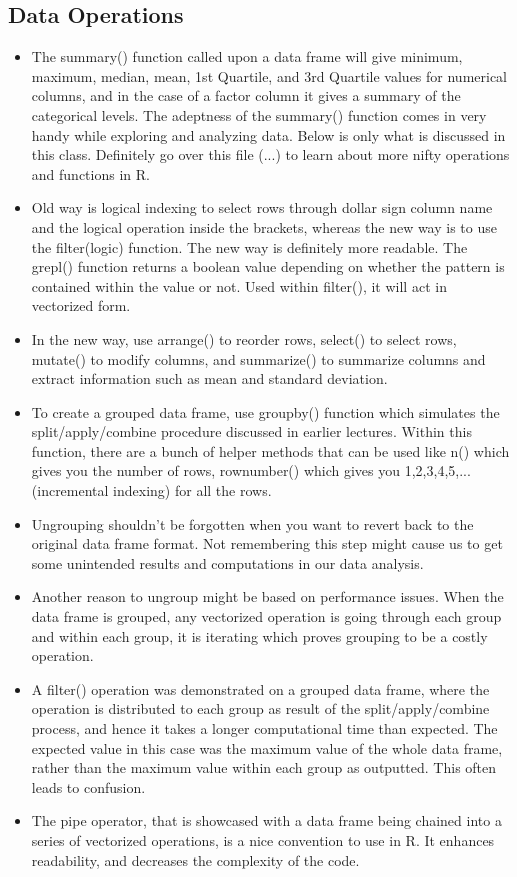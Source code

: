 \subsection{Data Operations}
\begin{itemize}
    \item The summary() function called upon a data frame will give minimum, maximum,
    median, mean, 1st Quartile, and 3rd Quartile values for numerical columns, and in the
    case of a factor column it gives a summary of the categorical levels. The adeptness of
    the summary() function comes in very handy while exploring and analyzing data.
    Below is only what is discussed in this class. Definitely go over this file (...) to
    learn about more nifty operations and functions in R.
    \item Old way is logical indexing to select rows through dollar sign column name and
    the logical operation inside the brackets, whereas the new way is to use the
    filter(logic) function. The new way is definitely more readable. The grepl() function
    returns a boolean value depending on whether the pattern is contained within the value
    or not. Used within filter(), it will act in vectorized form.
    \item In the new way, use arrange() to reorder rows, select() to select rows, mutate()
    to modify columns, and summarize() to summarize columns and extract information such
    as mean and standard deviation.
    \item To create a grouped data frame, use groupby() function which simulates the
    split/apply/combine procedure discussed in earlier lectures. Within this function,
    there are a bunch of helper methods that can be used like n() which gives you the
    number of rows, rownumber() which gives you 1,2,3,4,5,... (incremental indexing) for
    all the rows. 
    \item Ungrouping shouldn't be forgotten when you want to revert back to the original
    data frame format. Not remembering this step might cause us to get some unintended
    results and computations in our data analysis.
    \item Another reason to ungroup might be based on performance issues. When the data
    frame is grouped, any vectorized operation is going through each group and within each
    group, it is iterating which proves grouping to be a costly operation. 
    \item A filter() operation was demonstrated on a grouped data frame, where the
    operation is distributed to each group as result of the split/apply/combine process,
    and hence it takes a longer computational time than expected. The expected value in
    this case was the maximum value of the whole data frame, rather than the maximum value
    within each group as outputted. This often leads to confusion.
    \item The pipe operator, that is showcased with a data frame being chained into a
    series of vectorized operations, is a nice convention to use in R. It enhances
    readability, and decreases the complexity of the code.
\end{itemize}

